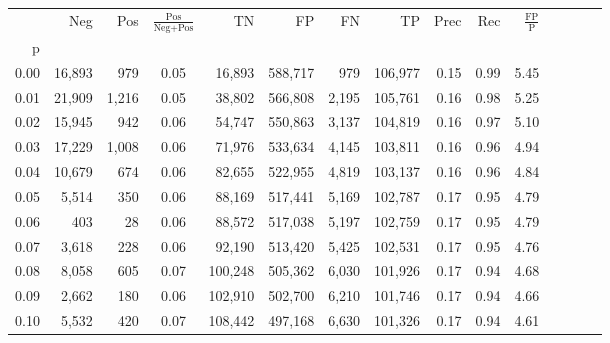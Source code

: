 \begin{tabular}{rrrcrrrrrrrrrrr}
\toprule
{} &     Neg &    Pos & $\frac{\text{Pos}}{\text{Neg}+\text{Pos}}$ &       TN &       FP &       FN &       TP &  Prec &   Rec & $\frac{\text{FP}}{\text{P}}$ \\
p    &         &        &                                            &          &          &          &          &       &       &                              \\
\midrule
0.00 &  16,893 &    979 &                                       0.05 &   16,893 &  588,717 &      979 &  106,977 &  0.15 &  0.99 &                         5.45 \\
0.01 &  21,909 &  1,216 &                                       0.05 &   38,802 &  566,808 &    2,195 &  105,761 &  0.16 &  0.98 &                         5.25 \\
0.02 &  15,945 &    942 &                                       0.06 &   54,747 &  550,863 &    3,137 &  104,819 &  0.16 &  0.97 &                         5.10 \\
0.03 &  17,229 &  1,008 &                                       0.06 &   71,976 &  533,634 &    4,145 &  103,811 &  0.16 &  0.96 &                         4.94 \\
0.04 &  10,679 &    674 &                                       0.06 &   82,655 &  522,955 &    4,819 &  103,137 &  0.16 &  0.96 &                         4.84 \\
0.05 &   5,514 &    350 &                                       0.06 &   88,169 &  517,441 &    5,169 &  102,787 &  0.17 &  0.95 &                         4.79 \\
0.06 &     403 &     28 &                                       0.06 &   88,572 &  517,038 &    5,197 &  102,759 &  0.17 &  0.95 &                         4.79 \\
0.07 &   3,618 &    228 &                                       0.06 &   92,190 &  513,420 &    5,425 &  102,531 &  0.17 &  0.95 &                         4.76 \\
0.08 &   8,058 &    605 &                                       0.07 &  100,248 &  505,362 &    6,030 &  101,926 &  0.17 &  0.94 &                         4.68 \\
0.09 &   2,662 &    180 &                                       0.06 &  102,910 &  502,700 &    6,210 &  101,746 &  0.17 &  0.94 &                         4.66 \\
0.10 &   5,532 &    420 &                                       0.07 &  108,442 &  497,168 &    6,630 &  101,326 &  0.17 &  0.94 &                         4.61 \\

\end{tabular}
